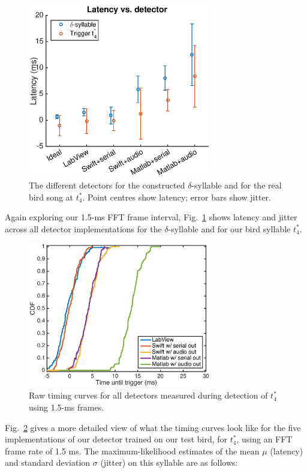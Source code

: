 \documentclass[10pt,letterpaper]{article}
\newcommand\fig[1]{Fig.~\ref{#1}}
\begin{document}
\begin{figure}
  \begin{center}
    \includegraphics[width=8cm]{TimingVsDetector}
  \end{center}
  \caption{The different detectors for the constructed $\delta$-syllable and for the real bird song at $t^*_4$.  Point centres show latency; error bars show jitter.}
  \label{fig:TimingVsDetector}
\end{figure}

Again exploring our 1.5-ms FFT frame interval, \fig{fig:TimingVsDetector} shows latency and jitter across all detector implementations for the $\delta$-syllable and for our bird syllable $t^*_4$.

\begin{figure}
  \begin{center}
    \includegraphics[width=8cm]{timing}
  \end{center}
  \caption{Raw timing curves for all detectors measured during detection of $t^*_4$ using 1.5-ms frames.}
  \label{fig:timing}
\end{figure}


\fig{fig:timing} gives a more detailed view of what the timing curves look like for the five implementations of our detector trained on our test bird, for $t^*_4$, using an FFT frame rate of 1.5 ms.  The maximum-likelihood estimates of the mean $\mu$ (latency) and standard deviation $\sigma$ (jitter) on this syllable are as follows:
\end{document}
